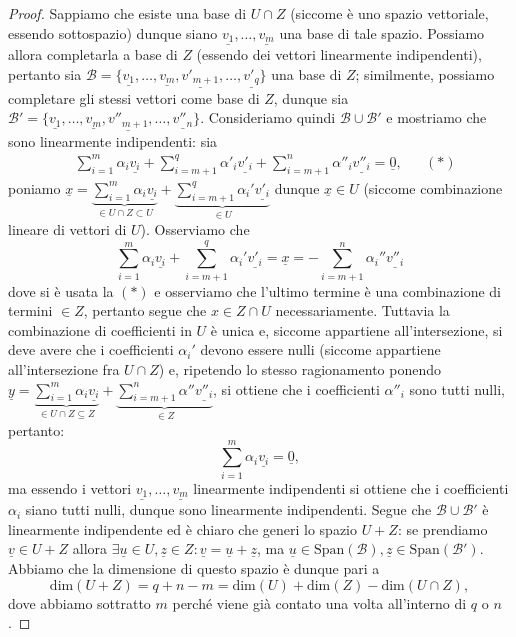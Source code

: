 \begin{proof}
    Sappiamo che esiste una base di $U \cap Z$ (siccome è uno spazio vettoriale, essendo sottospazio) dunque siano $\underline{v_1}, \ldots, \underline{v_m}$ una base di tale spazio. Possiamo allora completarla a base di $Z$ (essendo dei vettori linearmente indipendenti), pertanto sia $\mathcal{B} = \{ \underline{v_1}, \ldots, \underline{v_m}, \underline{v'_{m+1}}, \ldots, \underline{v'_q} \}$ una base di $Z$; similmente, possiamo completare gli stessi vettori come base di $Z$, dunque sia $\mathcal{B'} = \{ \underline{v_1}, \ldots, \underline{v_m}, \underline{v''_{m+1}}, \ldots, \underline{v''_n} \}$. Consideriamo
    quindi $\mathcal{B} \cup \mathcal{B'}$ e mostriamo che sono linearmente indipendenti: sia
    \begin{align}
        &\sum_{i=1}^m \alpha_i \underline{v_i} + \sum_{i=m+1}^q \alpha'_i \underline{v'_i} + \sum_{i=m+1}^n \alpha''_i \underline{v''_i} = \underline{0}, & &(\ast)
    \end{align}
    poniamo $\underline{x} = \underbrace{\sum_{i=1}^m \alpha_i \underline{v_i}}_{\in U \cap Z \subset U} + \underbrace{\sum_{i=m+1}^q \alpha_i' \underline{v'_i}}_{\in U}$ dunque $\underline{x} \in U$ (siccome combinazione lineare di vettori di $U$). Osserviamo che
    $$
        \sum_{i=1}^m \alpha_i \underline{v_i} + \sum_{i=m+1}^q \alpha_i' \underline{v'_i} = \underline{x} = - \sum_{i=m+1}^n \alpha_i'' \underline{v''_i}
    $$
    dove si è usata la $(\ast)$ e osserviamo che l'ultimo termine è una combinazione di termini $\in Z$, pertanto segue che $x \in Z \cap U$ necessariamente. Tuttavia la combinazione di coefficienti in $U$ è unica e, siccome appartiene all'intersezione, si deve avere che i coefficienti $\alpha_i'$ devono essere nulli (siccome appartiene all'intersezione fra $U \cap Z$) e, ripetendo lo stesso ragionamento ponendo $\underline{y} = \underbrace{\sum_{i=1}^m \alpha_i \underline{v_i}}_{\in U \cap Z \subseteq Z} + \underbrace{\sum_{i=m+1}^n \alpha'' \underline{v''_i}}_{\in Z}$, si ottiene che i coefficienti $\alpha''_i$ sono tutti nulli, pertanto:
    $$
        \sum_{i=1}^m \alpha_i \underline{v_i} = \underline{0},
    $$
    ma essendo i vettori $\underline{v_1}, \ldots, \underline{v_m}$ linearmente indipendenti si ottiene che i coefficienti $\alpha_i$ siano tutti nulli, dunque sono linearmente indipendenti. Segue che $\mathcal{B} \cup \mathcal{B'}$ è linearmente indipendente ed è chiaro che generi lo spazio $U + Z$: se prendiamo $\underline{v} \in U + Z$ allora $\exists \underline{u} \in U, \underline{z} \in Z : \underline{v} = \underline{u} + \underline{z}$, ma $\underline{u} \in \text{Span}(\mathcal{B}), \underline{z} \in \text{Span}(\mathcal{B'})$. Abbiamo che la dimensione di questo spazio è dunque pari a
    $$
        \text{dim}(U + Z) = q + n - m = \text{dim}(U) + \text{dim}(Z) - \text{dim}(U \cap Z),
    $$
    dove abbiamo sottratto $m$ perché viene già contato una volta all'interno di $q$ o $n$.
\end{proof}
